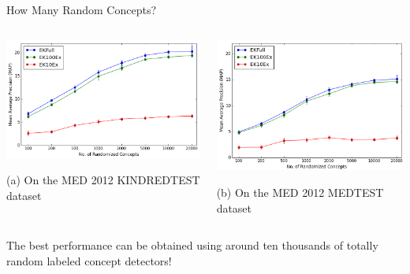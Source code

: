 \documentclass{beamer}
\begin{document}
\begin{frame}{How Many Random Concepts?} 

\bigskip

\begin{columns}
  \begin{column}{0.5\textwidth}
    \centerline{\includegraphics[width=1\textwidth]{images/p_exp2.png}}
    (a) On the MED 2012 KINDREDTEST dataset
  \end{column}

  \begin{column}{0.5\textwidth}
    \centerline{\includegraphics[width=1\textwidth]{images/p_exp2_mt.png}}
    (b) On the MED 2012 MEDTEST dataset
  \end{column}
\end{columns}
\bigskip
 
The best performance can be obtained using around ten thousands of totally random labeled concept detectors!
  
\end{frame}
\end{document}
